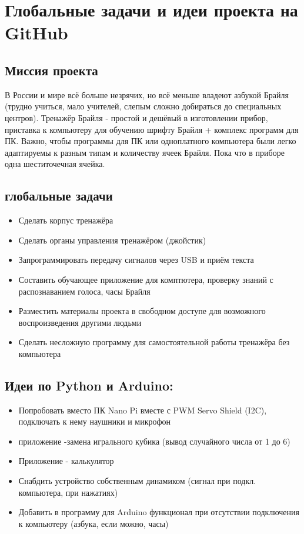 \documentclass[a4paper,12pt]{article} %
\begin{document}
\section{Глобальные задачи и идеи проекта на GitHub}
\subsection{Миссия проекта}
В России и мире всё больше незрячих, но всё меньше владеют азбукой Брайля (трудно учиться, мало учителей, слепым сложно добираться до специальных центров). Тренажёр Брайля - простой и дешёвый в изготовлении прибор, приставка к компьютеру для обучению шрифту Брайля + комплекс программ для ПК.
Важно, чтобы программы для ПК или одноплатного компьютера были легко адаптируемы к разным типам и количеству ячеек Брайля. Пока что в приборе одна шеститочечная ячейка.
\subsection{глобальные задачи}
\begin{itemize}
\item{} Сделать корпус тренажёра
\item{} Сделать органы управления тренажёром (джойстик)
\item{} Запрограммировать передачу сигналов через USB и приём текста
\item{} Составить обучающее приложение для комптютера, проверку знаний с распознаванием голоса, часы Брайля
\item{} Разместить материалы проекта в свободном доступе для возможного воспроизведения другими людьми
\item{} Сделать несложную программу для самостоятельной работы тренажёра без компьютера
\end{itemize}

\subsection{Идеи по Python и Arduino:}
\begin{itemize}
\item{} Попробовать вместо ПК Nano Pi вместе с PWM Servo Shield (I2C), подключать к нему наушники и микрофон
\item{} приложение -замена игрального кубика (вывод случайного числа от 1 до 6)
\item{} Приложение - калькулятор
\item{} Снабдить устройство собственным динамиком (сигнал при подкл. компьютера, при нажатиях)
\item{} Добавить в программу для Arduino функционал при отсутствии подключения к компьютеру (азбука, если можно, часы)
\end{itemize}
\end{document}
